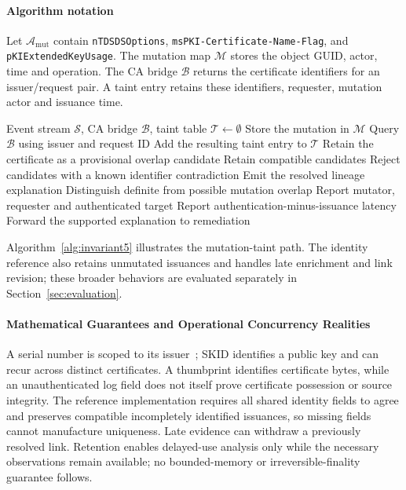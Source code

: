 \paragraph{Algorithm notation}
Let $\mathcal A_{\mathrm{mut}}$ contain \texttt{nTDSDSOptions}, \texttt{msPKI-Certificate-Name-Flag}, and \texttt{pKIExtendedKeyUsage}. The mutation map $\mathcal M$ stores the object GUID, actor, time and operation. The CA bridge $\mathcal B$ returns the certificate identifiers for an issuer/request pair. A taint entry retains these identifiers, requester, mutation actor and issuance time.

\begin{algorithm}[tbp]
\caption{CIPG certificate-lineage update}
\label{alg:invariant5}
\footnotesize
\begin{algorithmic}[1]
\Require Event stream $\mathcal S$, CA bridge $\mathcal B$, taint table $\mathcal T\gets\emptyset$
  \State Store the mutation in $\mathcal M$
  \State Query $\mathcal B$ using issuer and request ID
  \State Add the resulting taint entry to $\mathcal T$
  \State Retain the certificate as a provisional overlap candidate
  \State Retain compatible candidates
  \State Reject candidates with a known identifier contradiction
   \State Emit the resolved lineage explanation
   \State Distinguish definite from possible mutation overlap
   \State Report mutator, requester and authenticated target
   \State Report authentication-minus-issuance latency
   \State Forward the supported explanation to remediation
  \EndIf
 \EndIf
\EndFor
\end{algorithmic}
\end{algorithm}


Algorithm~\ref{alg:invariant5} illustrates the mutation-taint path. The identity reference also retains unmutated issuances and handles late enrichment and link revision; these broader behaviors are evaluated separately in Section~\ref{sec:evaluation}.

\paragraph{Mathematical Guarantees and Operational Concurrency Realities}
A serial number is scoped to its issuer~\cite{rfc5280}; SKID identifies a public key and can recur across distinct certificates. A thumbprint identifies certificate bytes, while an unauthenticated log field does not itself prove certificate possession or source integrity. The reference implementation requires all shared identity fields to agree and preserves compatible incompletely identified issuances, so missing fields cannot manufacture uniqueness. Late evidence can withdraw a previously resolved link. Retention enables delayed-use analysis only while the necessary observations remain available; no bounded-memory or irreversible-finality guarantee follows.

